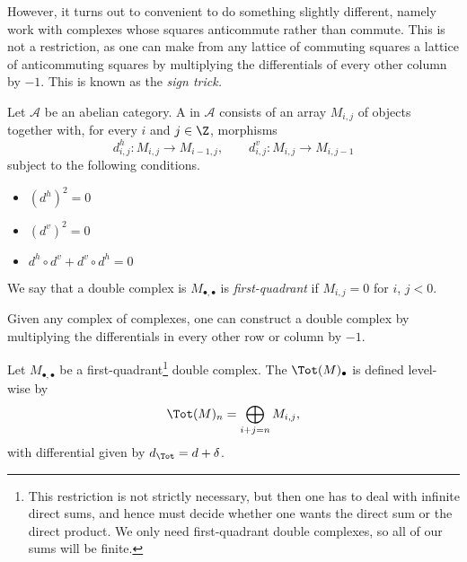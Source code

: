\documentclass[main.tex]{subfiles}
\begin{document}
However, it turns out to convenient to do something slightly different, namely work with complexes whose squares anticommute rather than commute. This is not a restriction, as one can make from any lattice of commuting squares a lattice of anticommuting squares by multiplying the differentials of every other column by $-1$. This is known as the \emph{sign trick.}

\begin{definition}
  \label{def:double_complex}
  Let $\mathcal{A}$ be an abelian category. A  in $\mathcal{A}$ consists of an array $M_{i,j}$ of objects together with, for every $i$ and $j \in \Z$, morphisms
  \begin{equation*}
    d^{h}_{i,j}\colon M_{i,j} \to M_{i-1,j},\qquad d^{v}_{i,j}\colon M_{i,j} \to M_{i, j-1}
  \end{equation*}
  subject to the following conditions.
  \begin{itemize}
    \item $(d^{h})^{2} = 0$

    \item $(d^{v})^{2} = 0$

    \item $d^{h} \circ d^{v} + d^{v} \circ d^{h} = 0$
  \end{itemize}

\end{definition}

We say that a double complex is $M_{\bullet,\bullet}$ is \emph{first-quadrant} if $M_{i,j} = 0$ for $i$, $j < 0$.

Given any complex of complexes, one can construct a double complex by multiplying the differentials in every other row or column by $-1$.

\begin{definition}
  \label{def:total_complex}
  Let $M_{\bullet, \bullet}$ be a first-quadrant\footnote{This restriction is not strictly necessary, but then one has to deal with infinite direct sums, and hence must decide whether one wants the direct sum or the direct product. We only need first-quadrant double complexes, so all of our sums will be finite.} double complex. The  $\Tot(M)_{\bullet}$ is defined level-wise by
  \begin{equation*}
    \Tot(M)_{n}  = \bigoplus_{i + j = n} M_{i,j},
  \end{equation*}
  with differential given by $d_{\Tot} = d + \delta$.
\end{definition}
\end{document}
